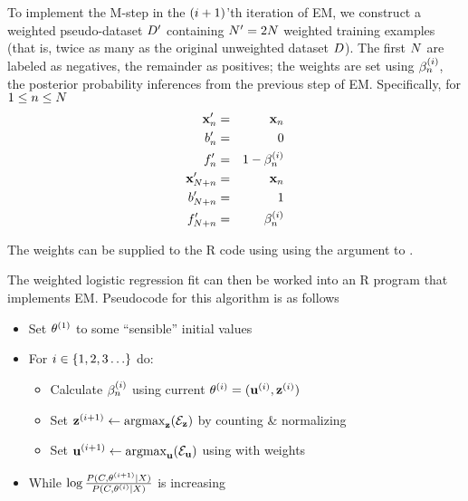 \documentclass{article}
\begin{document}
To implement the M-step in the $(i+1)$'th iteration of EM,
we construct a weighted pseudo-dataset $D'$ containing $N' = 2N$ weighted training examples
(that is, twice as many as the original unweighted dataset $D$).
The first $N$ are labeled as negatives, the remainder as positives;
the weights are set using $\beta^{(i )}_{n}$, the posterior probability inferences from the previous step of EM.
Specifically, for $1 \leq n \leq N$
\begin{eqnarray*}
  {\bf x}'_{n} & = & {\bf x}_{n} \\
  b'_{n} & = & 0 \\
  f'_{n} & = & 1 - \beta^{(i )}_{n} \\
  {\bf x}'_{N+n} & = & {\bf x}_{n} \\
  b'_{N+n} & = & 1 \\
  f'_{N+n} & = & \beta^{(i )}_{n}
\end{eqnarray*}

The weights can be supplied to the R code using using the  argument to .

The weighted logistic regression fit can then be worked into an R program that implements EM.
Pseudocode for this algorithm is as follows
\begin{itemize}
\item Set $\theta^{(1)}$ to some ``sensible'' initial values
\item For $i \in \{ 1, 2, 3 \ldots \}$ do:
\begin{itemize}
\item Calculate $\beta^{(i )}_{n}$ using current $\theta^{(i)} = ({\bf u}^{(i)},{\bf z}^{(i)})$
\item Set ${\bf z}^{(i+1)} \leftarrow \mbox{argmax}_{{\bf z}} ( {\cal E}_{{\bf z}} )$ by counting \& normalizing
\item Set ${\bf u}^{(i+1)} \leftarrow \mbox{argmax}_{{\bf u}} ( {\cal E}_{{\bf u}} )$ using  with weights
\end{itemize}
\item While $\log \frac{P(C,\theta^{(i+1)}|X)}{P(C,\theta^{(i)}|X)}$ is increasing
\end{itemize}



\end{document}
